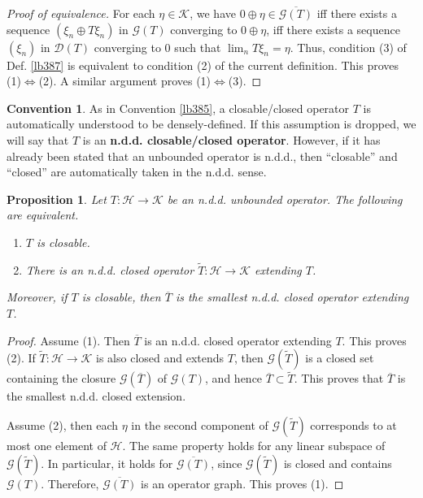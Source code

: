 \documentclass[12pt,b5paper,notitlepage]{article}
\theoremstyle{definition}
\newtheorem{cv}[df]{Convention}
\theoremstyle{plain}
\newtheorem{pp}[df]{Proposition}
\newcommand{\wtd}{\widetilde}
\newcommand{\ovl}{\overline}
\newcommand{\Dom}{\mathscr{D}}
\newcommand{\MH}{\mathcal H}
\newcommand{\MK}{\mathcal K}
\newcommand{\SG}{\mathscr G}
\numberwithin{equation}{section}
\begin{document}
\begin{proof}[Proof of equivalence]
For each $\eta\in\MK$, we have $0\oplus\eta\in\ovl{\SG(T)}$ iff there exists a sequence $(\xi_n\oplus T\xi_n)$ in $\SG(T)$ converging to $0\oplus\eta$, iff there exists a sequence $(\xi_n)$ in $\Dom(T)$ converging to $0$ such that $\lim_n T\xi_n=\eta$. Thus, condition (3) of Def. \ref{lb387} is equivalent to condition (2) of the current definition. This proves (1)$\Leftrightarrow$(2). A similar argument proves (1)$\Leftrightarrow$(3).
\end{proof}



\begin{cv}
As in Convention \ref{lb385}, a closable/closed operator $T$ is automatically understood to be densely-defined. If this assumption is dropped, we will say that $T$ is an \textbf{n.d.d. closable/closed operator}. However, if it has already been stated that an unbounded operator is n.d.d., then ``closable'' and ``closed'' are automatically taken in the n.d.d. sense.
\end{cv}


\begin{pp}
Let $T:\MH\rightarrow\MK$ be an n.d.d. unbounded operator. The following are equivalent.
\begin{enumerate}
\item[(1)] $T$ is closable.
\item[(2)] There is an n.d.d. closed operator $\wtd T:\MH\rightarrow\MK$ extending $T$.
\end{enumerate}
Moreover, if $T$ is closable, then $\ovl T$ is the smallest n.d.d. closed operator extending $T$. 
\end{pp}



\begin{proof}
Assume (1). Then $\ovl T$ is an n.d.d. closed operator extending $T$. This proves (2). If $\wtd T:\MH\rightarrow\MK$ is also closed and extends $T$, then $\SG(\wtd T)$ is a closed set containing the closure $\SG(\ovl T)$ of $\SG(T)$, and hence $\ovl T\subset\wtd T$. This proves that $\ovl T$ is the smallest n.d.d. closed extension.

Assume (2), then each $\eta$ in the second component of $\SG(\wtd T)$ corresponds to at most one element of $\MH$. The same property holds for any linear subspace of $\SG(\wtd T)$. In particular, it holds for $\ovl{\SG(T)}$, since $\SG(\wtd T)$ is closed and contains $\SG(T)$. Therefore, $\ovl{\SG(T)}$ is an operator graph. This proves (1).
\end{proof}
\end{document}
